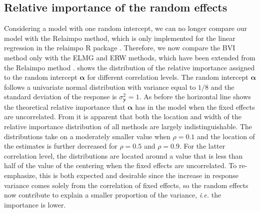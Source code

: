 \subsection{Relative importance of the random effects}
\label{sec:relimp_random}
Considering a model with one random intercept, we can no longer compare our model with the Relaimpo method, which is only implemented for the linear regression in the relaimpo R package \citep{gromping_relaimpo}. Therefore, we now compare the BVI method only with the ELMG and ERW methods, which have been extended from the Relaimpo method \citep{matre}.
 shows the distribution of the relative importance assigned to the random intercept $\boldsymbol{\alpha}$ for different correlation levels. 
The random intercept $\boldsymbol{\alpha}$ follows a univariate normal distribution with variance equal to $1/8$ and the standard deviation of the response is $\sigma^2_{\mathbf{y}}=1$. 
As before the horizontal line shows the theoretical relative importance that $\boldsymbol{\alpha}$ has in the model when the fixed effects are uncorrelated.
\newline
\newline
From  it is apparent that both the location and width of the relative importance distribution of all methods are largely indistinguishable. 
The distributions take on a moderately smaller value when $\rho=0.1$ and the location of the estimates is further decreased for $\rho=0.5$ and $\rho=0.9$. 
For the latter correlation level, the distributions are located around a value that is less than half of the value of the centering when the fixed effects are uncorrelated. 
To re-emphasize, this is both expected and desirable since the increase in response variance comes solely from the correlation of fixed effects, so the random effects now contribute to explain a smaller proportion of the variance, \textit{i.e.} the importance is lower.
